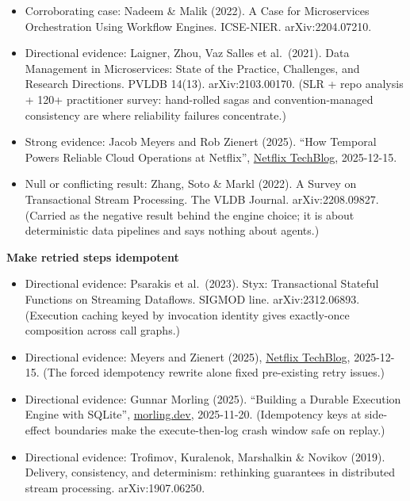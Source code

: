 \begin{itemize}
\tightlist
\item
  Corroborating case: Nadeem \& Malik (2022). A Case for Microservices Orchestration Using Workflow Engines. ICSE-NIER. arXiv:2204.07210.
\item
  Directional evidence: Laigner, Zhou, Vaz Salles et al.~(2021). Data Management in Microservices: State of the Practice, Challenges, and Research Directions. PVLDB 14(13). arXiv:2103.00170. (SLR + repo analysis + 120+ practitioner survey: hand-rolled sagas and convention-managed consistency are where reliability failures concentrate.)
\item
  Strong evidence: Jacob Meyers and Rob Zienert (2025). ``How Temporal Powers Reliable Cloud Operations at Netflix'', \href{https://netflixtechblog.com/how-temporal-powers-reliable-cloud-operations-at-netflix-73c69ccb5953}{Netflix TechBlog}, 2025-12-15.
\item
  Null or conflicting result: Zhang, Soto \& Markl (2022). A Survey on Transactional Stream Processing. The VLDB Journal. arXiv:2208.09827. (Carried as the negative result behind the engine choice; it is about deterministic data pipelines and says nothing about agents.)
\end{itemize}

\textbf{Make retried steps idempotent}

\begin{itemize}
\tightlist
\item
  Directional evidence: Psarakis et al.~(2023). Styx: Transactional Stateful Functions on Streaming Dataflows. SIGMOD line. arXiv:2312.06893. (Execution caching keyed by invocation identity gives exactly-once composition across call graphs.)
\item
  Directional evidence: Meyers and Zienert (2025), \href{https://netflixtechblog.com/how-temporal-powers-reliable-cloud-operations-at-netflix-73c69ccb5953}{Netflix TechBlog}, 2025-12-15. (The forced idempotency rewrite alone fixed pre-existing retry issues.)
\item
  Directional evidence: Gunnar Morling (2025). ``Building a Durable Execution Engine with SQLite'', \href{https://www.morling.dev/blog/building-durable-execution-engine-with-sqlite/}{morling.dev}, 2025-11-20. (Idempotency keys at side-effect boundaries make the execute-then-log crash window safe on replay.)
\item
  Directional evidence: Trofimov, Kuralenok, Marshalkin \& Novikov (2019). Delivery, consistency, and determinism: rethinking guarantees in distributed stream processing. arXiv:1907.06250.
\end{itemize}
